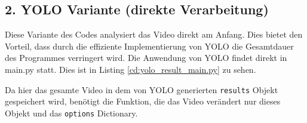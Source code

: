 \subsection{2. YOLO Variante (direkte Verarbeitung)}{
	\label{py:YOLO_res_vers}
	Diese Variante des Codes analysiert das Video direkt am Anfang. Dies bietet den Vorteil, dass durch die effiziente Implementierung von YOLO die Gesamtdauer des Programmes verringert wird. Die Anwendung von YOLO findet direkt in main.py statt. Dies ist in Listing \ref{cd:yolo_result_main.py} zu sehen.
	
	Da hier das gesamte Video in dem von YOLO generierten \lstinline|results| Objekt gespeichert wird, benötigt die Funktion, die das Video verändert nur dieses Objekt und das \lstinline|options| Dictionary. \\
	

}
